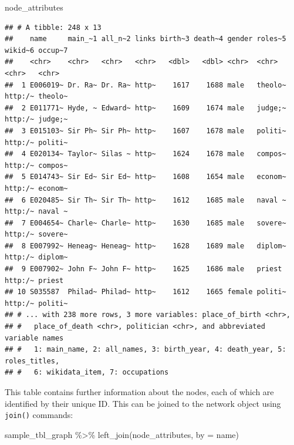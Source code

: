 \documentclass[
]{book}
\newenvironment{Shaded}{\begin{snugshade}}{\end{snugshade}}
\newcommand{\AttributeTok}[1]{\textcolor[rgb]{0.77,0.63,0.00}{#1}}
\newcommand{\FunctionTok}[1]{\textcolor[rgb]{0.00,0.00,0.00}{#1}}
\newcommand{\NormalTok}[1]{#1}
\newcommand{\SpecialCharTok}[1]{\textcolor[rgb]{0.00,0.00,0.00}{#1}}
\newcommand{\StringTok}[1]{\textcolor[rgb]{0.31,0.60,0.02}{#1}}
\begin{document}
\begin{Shaded}
\begin{Highlighting}[]
\NormalTok{node\_attributes}
\end{Highlighting}
\end{Shaded}

\begin{verbatim}
## # A tibble: 248 x 13
##    name     main_~1 all_n~2 links birth~3 death~4 gender roles~5 wikid~6 occup~7
##    <chr>    <chr>   <chr>   <chr>   <dbl>   <dbl> <chr>  <chr>   <chr>   <chr>  
##  1 E006019~ Dr. Ra~ Dr. Ra~ http~    1617    1688 male   theolo~ http:/~ theolo~
##  2 E011771~ Hyde, ~ Edward~ http~    1609    1674 male   judge;~ http:/~ judge;~
##  3 E015103~ Sir Ph~ Sir Ph~ http~    1607    1678 male   politi~ http:/~ politi~
##  4 E020134~ Taylor~ Silas ~ http~    1624    1678 male   compos~ http:/~ compos~
##  5 E014743~ Sir Ed~ Sir Ed~ http~    1608    1654 male   econom~ http:/~ econom~
##  6 E020485~ Sir Th~ Sir Th~ http~    1612    1685 male   naval ~ http:/~ naval ~
##  7 E004654~ Charle~ Charle~ http~    1630    1685 male   sovere~ http:/~ sovere~
##  8 E007992~ Heneag~ Heneag~ http~    1628    1689 male   diplom~ http:/~ diplom~
##  9 E007902~ John F~ John F~ http~    1625    1686 male   priest  http:/~ priest 
## 10 S035587  Philad~ Philad~ http~    1612    1665 female politi~ http:/~ politi~
## # ... with 238 more rows, 3 more variables: place_of_birth <chr>,
## #   place_of_death <chr>, politician <chr>, and abbreviated variable names
## #   1: main_name, 2: all_names, 3: birth_year, 4: death_year, 5: roles_titles,
## #   6: wikidata_item, 7: occupations
\end{verbatim}

This table contains further information about the nodes, each of which are identified by their unique ID. This can be joined to the network object using \texttt{join()} commands:

\begin{Shaded}
\begin{Highlighting}[]
\NormalTok{sample\_tbl\_graph }\SpecialCharTok{\%\textgreater{}\%} 
  \FunctionTok{left\_join}\NormalTok{(node\_attributes, }\AttributeTok{by =} \StringTok{\textquotesingle{}name\textquotesingle{}}\NormalTok{)}
\end{Highlighting}
\end{Shaded}
\end{document}
